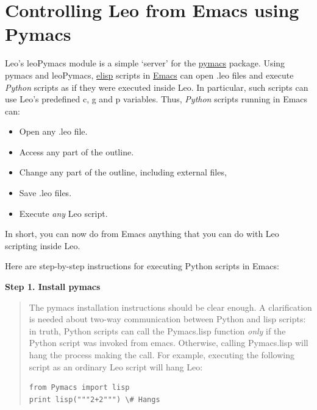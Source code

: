 \documentclass[a4paper,10pt,english]{sphinxmanual}
\begin{document}
\section{Controlling Leo from Emacs using Pymacs}
\label{emacs:controlling-leo-from-emacs-using-pymacs}\label{emacs:customizing-leo}
Leo's leoPymacs module is a simple `server' for the \href{http://pymacs.progiciels-bpi.ca/index.html}{pymacs} package.
Using pymacs and leoPymacs, \href{http://en.wikipedia.org/wiki/Emacs\_Lisp}{elisp} scripts in \href{http://www.xemacs.org/}{Emacs} can open .leo files and execute \emph{Python} scripts
as if they were executed inside Leo.
In particular, such scripts can use Leo's predefined c, g and p variables.
Thus, \emph{Python} scripts running in Emacs can:
\begin{itemize}
\item {} 
Open any .leo file.

\item {} 
Access any part of the outline.

\item {} 
Change any part of the outline, including external files,

\item {} 
Save .leo files.

\item {} 
Execute \emph{any} Leo script.

\end{itemize}

In short, you can now do from Emacs anything that you can do with Leo scripting inside Leo.

Here are step-by-step instructions for executing Python scripts in Emacs:

\textbf{Step 1. Install pymacs}
\begin{quote}

The pymacs installation instructions should be clear enough.
A clarification is needed about two-way communication between Python and lisp scripts:
in truth, Python scripts can call the Pymacs.lisp function \emph{only} if the Python script
was invoked from emacs.
Otherwise, calling Pymacs.lisp will hang the process making the call.
For example, executing the following script as an ordinary Leo script will hang Leo:

\begin{Verbatim}[commandchars=\\\{\}]
from Pymacs import lisp
print lisp("""2+2""") \# Hangs
\end{Verbatim}
\end{quote}
\end{document}
